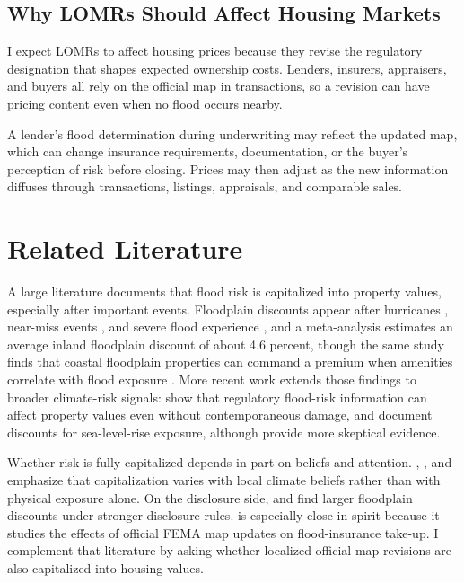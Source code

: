 \documentclass[12pt]{article}
\begin{document}
\subsection{Why LOMRs Should Affect Housing Markets}\label{sec:bg_channels}

I expect LOMRs to affect housing prices because they revise the regulatory designation that shapes expected ownership costs. Lenders, insurers, appraisers, and buyers all rely on the official map in transactions, so a revision can have pricing content even when no flood occurs nearby.

A lender's flood determination during underwriting may reflect the updated map, which can change insurance requirements, documentation, or the buyer's perception of risk before closing. Prices may then adjust as the new information diffuses through transactions, listings, appraisals, and comparable sales.

\section{Related Literature}\label{sec:literature}

A large literature documents that flood risk is capitalized into property values, especially after important events. Floodplain discounts appear after hurricanes \citep{BinPolasky2004}, near-miss events \citep{HallstromSmith2005}, and severe flood experience \citep{Kousky2010}, and a meta-analysis estimates an average inland floodplain discount of about 4.6 percent, though the same study finds that coastal floodplain properties can command a premium when amenities correlate with flood exposure \citep{BeltranMaddisonElliott2018}. More recent work extends those findings to broader climate-risk signals: \citet{HinoBurke2021} show that regulatory flood-risk information can affect property values even without contemporaneous damage, and \citet{BernsteinGustafsonLewis2019} document discounts for sea-level-rise exposure, although \citet{MurfinSpiegel2020} provide more skeptical evidence.

Whether risk is fully capitalized depends in part on beliefs and attention. \citet{BakkensenBarrage2022}, \citet{GibsonMullinsHill2020}, and \citet{BaldaufGarlappiYannelis2020} emphasize that capitalization varies with local climate beliefs rather than with physical exposure alone. On the disclosure side, \citet{TroyRomm2004} and \citet{Pope2008} find larger floodplain discounts under stronger disclosure rules. \citet{Weill2023} is especially close in spirit because it studies the effects of official FEMA map updates on flood-insurance take-up. I complement that literature by asking whether localized official map revisions are also capitalized into housing values.
\end{document}
